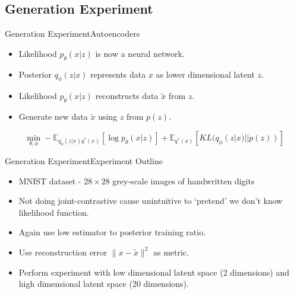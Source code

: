 \documentclass{beamer}
\begin{document}
\subsection{Generation Experiment}
\begin{frame}{Generation Experiment}{Autoencoders}
\begin{itemize}
\item Likelihood $p_\theta(x|z)$ is now a neural network.
\item Posterior $q_\phi(z|x)$ represents data $x$ as lower dimensional latent $z$.
\item Likelihood $p_\theta(x|z)$ reconstructs data $\tilde{x}$ from $z$.
\item Generate new data $\tilde{x}$ using $z$ from $p(z)$.
\end{itemize}
\begin{figure}[h]
  \centering
\end{figure}
\[\min_{\theta, \phi} -\mathbb{E}_{q_\phi(z|x)q^*(x)}[\log p_\theta(x|z)]+\mathbb{E}_{q^*(x)}[KL(q_\phi(z|x)||p(z))]\]
\end{frame}
\begin{frame}{Generation Experiment}{Experiment Outline}
\begin{itemize}
\item MNIST dataset - $28\times 28$ grey-scale images of handwritten digits
\item Not doing joint-contrastive cause unintuitive to `pretend' we don't know likelihood function.
\item Again use low estimator to posterior training ratio.
\item Use reconstruction error $\|x-\tilde{x}\|^2$ as metric.
\item Perform experiment with low dimensional latent space (2 dimensions) and high dimensional latent space (20 dimensions).
\end{itemize}
\end{frame}
\end{document}
